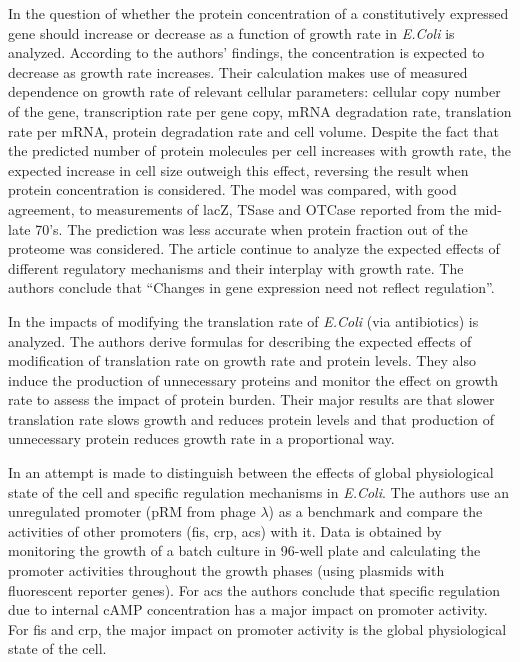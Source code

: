 \documentclass[a4page,notitlepage]{article}
\begin{document}
In \parencite{Klumpp2009a} the question of whether the protein concentration of a constitutively expressed gene should increase or decrease as a function of growth rate in \emph{E.Coli} is analyzed.
According to the authors' findings, the concentration is expected to decrease as growth rate increases.
Their calculation makes use of measured dependence on growth rate of relevant cellular parameters: cellular copy number of the gene, transcription rate per gene copy, mRNA degradation rate, translation rate per mRNA, protein degradation rate and cell volume.
Despite the fact that the predicted number of protein molecules per cell increases with growth rate, the expected increase in cell size outweigh this effect, reversing the result when protein concentration is considered.
The model was compared, with good agreement, to measurements of lacZ, TSase and OTCase reported from the mid-late 70's.
The prediction was less accurate when protein fraction out of the proteome was considered.
The article continue to analyze the expected effects of different regulatory mechanisms and their interplay with growth rate.
The authors conclude that ``Changes in gene expression need not reflect regulation''.

In \parencite{Scott2010b} the impacts of modifying the translation rate of \emph{E.Coli} (via antibiotics) is analyzed.
The authors derive formulas for describing the expected effects of modification of translation rate on growth rate and protein levels.
They also induce the production of unnecessary proteins and monitor the effect on growth rate to assess the impact of protein burden.
Their major results are that slower translation rate slows growth and reduces protein levels and that production of unnecessary protein reduces growth rate in a proportional way.

In \parencite{Berthoumieux2013} an attempt is made to distinguish between the effects of global physiological state of the cell and specific regulation mechanisms in \emph{E.Coli}.
The authors use an unregulated promoter (pRM from phage $\lambda$) as a benchmark and compare the activities of other promoters (fis, crp, acs) with it.
Data is obtained by monitoring the growth of a batch culture in 96-well plate and calculating the promoter activities throughout the growth phases (using plasmids with fluorescent reporter genes).
For acs the authors conclude that specific regulation due to internal cAMP concentration has a major impact on promoter activity.
For fis and crp, the major impact on promoter activity is the global physiological state of the cell.
\end{document}
